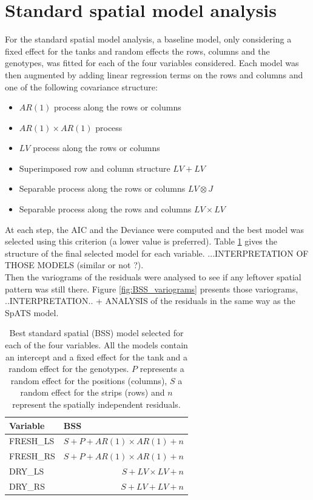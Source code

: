 \section{Standard spatial model analysis}
For the standard spatial model analysis, a baseline model, only considering a fixed effect for the tanks and random effects the rows, columns and the genotypes, was fitted for each of the four variables considered. Each model was then augmented by adding linear regression terms on the rows and columns and one of the following covariance structure:
\begin{itemize}
\item $AR(1)$ process along the rows or columns
\item $AR(1) \times AR(1)$ process
\item $LV$ process along the rows or columns
\item Superimposed row and column structure $LV + LV$
\item Separable process along the rows or columns $LV\otimes J$
\item Separable process along the rows and columns $LV \times LV$
\end{itemize}
At each step, the AIC and the Deviance were computed and the best model was selected using this criterion (a lower value is preferred). Table \ref{tab:selected_BSS_models} gives the structure of the final selected model for each variable. ...INTERPRETATION OF THOSE MODELS (similar or not ?).\\ 

Then the variograms of the residuals were analysed to see if any leftover spatial pattern was still there. Figure \ref{fig:BSS_variograms} presents those variograms, ..INTERPRETATION.. + ANALYSIS of the residuals in the same way as the SpATS model.

\begin{table}[htbp]
  \centering
  \caption[Selected BSS models]{Best standard spatial (BSS) model selected for each of the four variables. All the models 
  contain an intercept and a fixed effect for the tank and a random effect for the genotypes. $P$ represents a random effect for the positions (columns), $S$ a random effect for the strips (rows) and $n$ represent the spatially independent residuals.}
    \begin{tabular}{lr}
    \toprule
    Variable & \multicolumn{1}{l}{BSS} \\
    \midrule
    FRESH\_LS & $ S + P + AR(1) \times AR(1) + n$  \\
    FRESH\_RS &  $ S + P  + AR(1) \times AR(1) + n$ \\
    DRY\_LS & $S + LV\times LV + n$ \\
    DRY\_RS &  $S + LV+LV+n$\\
    \bottomrule
    \end{tabular}%
\label{tab:selected_BSS_models}
\end{table}%

